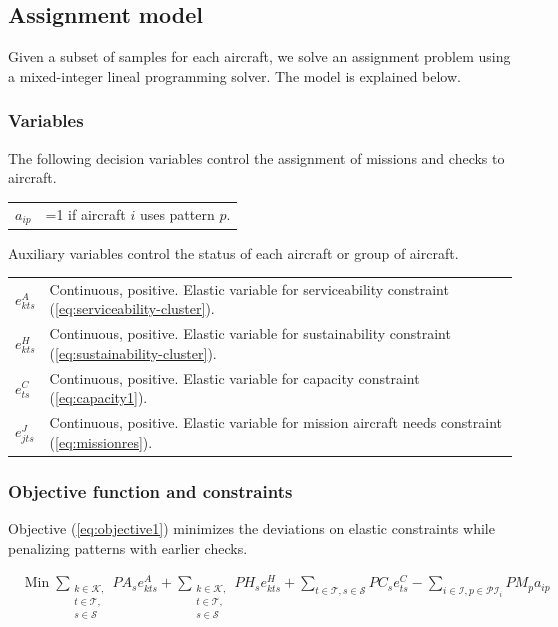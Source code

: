 \documentclass[a4paper,11pt]{article}
\begin{document}
  \subsection{Assignment model}
    \label{model}

    Given a subset of samples for each aircraft, we solve an assignment problem using a mixed-integer lineal programming solver. The model is explained below.

    \subsubsection{Variables}

      The following decision variables control the assignment of missions and checks to aircraft.

      \begin{tabular}{p{8mm}p{147mm}}
          $a_{ip}$ &  =1 if aircraft $i$ uses pattern $p$. \\  
      \end{tabular}

      Auxiliary variables control the status of each aircraft or group of aircraft.

      \begin{tabular}{p{8mm}p{147mm}}
          $e^{A}_{kts}$ & Continuous, positive. Elastic variable for serviceability constraint (\ref{eq:serviceability-cluster}). \\
          $e^{H}_{kts}$ & Continuous, positive. Elastic variable for sustainability constraint (\ref{eq:sustainability-cluster}). \\
          $e^{C}_{ts}$ & Continuous, positive. Elastic variable for capacity constraint (\ref{eq:capacity1}). \\
          $e^{J}_{jts}$ & Continuous, positive. Elastic variable for mission aircraft needs constraint (\ref{eq:missionres}). \\
      \end{tabular}

    \subsubsection{Objective function and constraints}
      Objective (\ref{eq:objective1}) minimizes the deviations on elastic constraints while penalizing patterns with earlier checks.

      \begin{align}
          & \text{Min}\; 
          \sum_{\substack{
                  k \in \mathcal{K}, \\ t \in \mathcal{T}, \\ s \in \mathcal{S}
                  }
              } PA_s e^{A}_{kts} 
          + \sum_{\substack{
                  k \in \mathcal{K}, \\ t \in \mathcal{T}, \\ s \in \mathcal{S}
                  } 
              } PH_s e^{H}_{kts}
          + \sum_{t \in \mathcal{T}, s \in \mathcal{S}} PC_s e^{C}_{ts}
          - \sum_{i \in \mathcal{I}, p \in \mathcal{PI}_i} PM_p a_{ip}
          \label{eq:objective1}
      \end{align}
\end{document}
